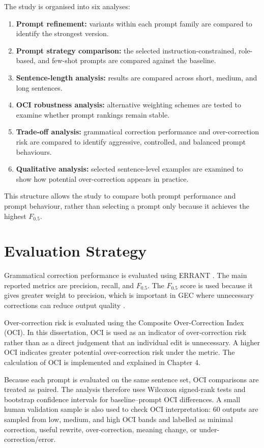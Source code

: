 The study is organised into six analyses:

\begin{enumerate}
    \item \textbf{Prompt refinement:} variants within each prompt family are compared to identify the strongest version.
    \item \textbf{Prompt strategy comparison:} the selected instruction-constrained, role-based, and few-shot prompts are compared against the baseline.
    \item \textbf{Sentence-length analysis:} results are compared across short, medium, and long sentences.
    \item \textbf{OCI robustness analysis:} alternative weighting schemes are tested to examine whether prompt rankings remain stable.
    \item \textbf{Trade-off analysis:} grammatical correction performance and over-correction risk are compared to identify aggressive, controlled, and balanced prompt behaviours.
    \item \textbf{Qualitative analysis:} selected sentence-level examples are examined to show how potential over-correction appears in practice.
\end{enumerate}

This structure allows the study to compare both prompt performance and prompt behaviour, rather than selecting a prompt only because it achieves the highest $F_{0.5}$.

\section{Evaluation Strategy}

Grammatical correction performance is evaluated using ERRANT \cite{bryant-etal-2017-automatic}. The main reported metrics are precision, recall, and $F_{0.5}$. The $F_{0.5}$ score is used because it gives greater weight to precision, which is important in GEC where unnecessary corrections can reduce output quality \cite{ng-etal-2014-conll}.

Over-correction risk is evaluated using the Composite Over-Correction Index (OCI). In this dissertation, OCI is used as an indicator of over-correction risk rather than as a direct judgement that an individual edit is unnecessary. A higher OCI indicates greater potential over-correction risk under the metric. The calculation of OCI is implemented and explained in Chapter 4.

Because each prompt is evaluated on the same sentence set, OCI comparisons are treated as paired. The analysis therefore uses Wilcoxon signed-rank tests and bootstrap confidence intervals for baseline--prompt OCI differences. A small human validation sample is also used to check OCI interpretation: 60 outputs are sampled from low, medium, and high OCI bands and labelled as minimal correction, useful rewrite, over-correction, meaning change, or under-correction/error.

